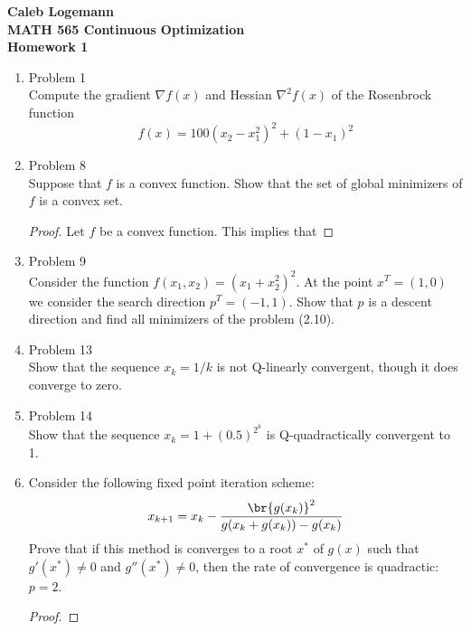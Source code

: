 \documentclass[11pt, oneside]{article}
\begin{document}
\noindent \textbf{\Large{Caleb Logemann \\
MATH 565 Continuous Optimization \\
Homework 1
}}

%
\begin{enumerate}
  \item %
    Problem 1 \\
    Compute the gradient $\nabla f(x)$ and Hessian $\nabla^2 f(x)$ of the
    Rosenbrock function
    \[
      f(x) = 100(x_2 - x_1^2)^2 + (1 - x_1)^2
    \]

  \item %
    Problem 8 \\
    Suppose that $f$ is a convex function.
    Show that the set of global minimizers of $f$ is a convex set.

    \begin{proof}
      Let $f$ be a convex function.
      This implies that 
    \end{proof}

  \item %
    Problem 9 \\
    Consider the function $f(x_1, x_2) = (x_1 + x_2^2)^2$.
    At the point $x^T = (1, 0)$ we consider the search direction $p^T = (-1, 1)$.
    Show that $p$ is a descent direction and find all minimizers of the problem
    (2.10).

  \item %
    Problem 13 \\
    Show that the sequence $x_k = 1/k$ is not Q-linearly convergent,
    though it does converge to zero.

  \item %
    Problem 14 \\
    Show that the sequence $x_k = 1 + (0.5)^{2^k}$ is Q-quadractically convergent
    to 1.

  \item %
    Consider the following fixed point iteration scheme:
    \[
      x_{k+1} = x_k - \frac{\br{g(x_k)}^2}{g(x_k + g(x_k)) - g(x_k)}
    \]
    Prove that if this method is converges to a root $x^*$ of $g(x)$ such that
    $g'(x^*)\neq 0$ and $g''(x^*) \neq 0$, then the rate of convergence is
    quadractic: $p = 2$.

    \begin{proof}
      
    \end{proof}


\end{enumerate}
\end{document}
